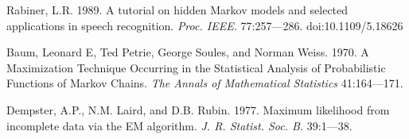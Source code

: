 \documentclass{biophys_letter}
\begin{document}
\begin{thebibliography}{99}
  Rabiner, L.R.
  1989.
  A tutorial on hidden Markov models and selected applications in speech recognition.
  {\it Proc. IEEE.}
  77:257---286.
  doi:10.1109/5.18626

  Baum, Leonard E, Ted Petrie, George Soules, and Norman Weiss. 
  1970.
  A Maximization Technique Occurring in the Statistical Analysis of Probabilistic Functions of Markov Chains.
  {\it The Annals of Mathematical Statistics}
  41:164---171.

  Dempster, A.P., N.M. Laird, and D.B. Rubin.
  1977.
  Maximum likelihood from incomplete data via the EM algorithm.
  {\it J. R. Statist. Soc. B.}
  39:1---38.

\end{thebibliography}
\end{document}
